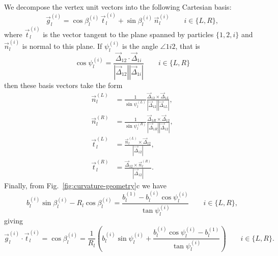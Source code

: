 We decompose the vertex unit vectors into the following Cartesian basis:
\begin{equation}\label{eq:vertex-unit-vector}
  \vec{g}_l^{(i)} =
  \cos{\beta_l^{(i)}} \, \vec{t}_l^{(i)} + \sin{\beta_l^{(i)}} \, \vec{n}_l^{(i)}
  \qquad i \in \{L,R\},
\end{equation}
where $\vec{t}_l^{(i)}$ is the vector tangent to the plane spanned by particles $\{1,2,i\}$ and $\vec{n}_l^{(i)}$ is normal to this plane.
If $\psi_l^{(i)}$ is the angle $\angle 1i2$, that is
\begin{equation}\label{eq:cos-psi}
  \cos{\psi_l^{(i)}} =
  \frac{\vec{\Delta}_{12} \cdot \vec{\Delta}_{1i}}
  {|\vec{\Delta}_{12}||\vec{\Delta}_{1i}|}
  \qquad i \in \{L,R\}
\end{equation}
then these basis vectors take the form
\begin{subequations}\label{eq:vertex-unit-vector-basis}
\begin{align}
  \vec{n}_l^{(L)} &=
  \frac{1}{\sin{\psi_l^{(L)}}}
  \frac{\vec{\Delta}_{12} \times \vec{\Delta}_{1L}}
  {|\vec{\Delta}_{12}||\vec{\Delta}_{1L}|}, \\
  \vec{n}_l^{(R)} &=
  \frac{1}{\sin{\psi_l^{(R)}}}
  \frac{\vec{\Delta}_{1R} \times \vec{\Delta}_{12}}
  {|\vec{\Delta}_{1R}||\vec{\Delta}_{12}|}, \\
  \vec{t}_l^{(L)} &=
  \frac{\vec{n}_l^{(L)} \times \vec{\Delta}_{12}}{|\vec{\Delta}_{12}|}, \\
  \vec{t}_l^{(R)} &=
  \frac{\vec{\Delta}_{12} \times \vec{n}_l^{(R)}}{|\vec{\Delta}_{12}|}.
\end{align}
\end{subequations}
Finally, from Fig.\ \ref{fig:curvature-geometry}c we have
\begin{equation}
  b_l^{(i)} \sin{\beta_l^{(i)}} - R_l \cos{\beta_l^{(i)}}
  = \frac{b_l^{(1)} - b_l^{(i)} \cos{\psi_l^{(i)}}}{\tan{\psi_l^{(i)}}}
  \qquad i \in \{L,R\},
\end{equation}
giving
\begin{equation}\label{eq:cos-beta}
  \vec{g}_l^{(i)} \cdot \vec{t}_l^{(i)} = \cos{\beta_l^{(i)}} =
  \frac{1}{R_l} \left(
    b_l^{(i)} \sin{\psi_l^{(i)}}
    + \frac{b_l^{(i)} \cos{\psi_l^{(i)}} - b_l^{(1)}}{\tan{\psi_l^{(i)}}}
  \right)
  \qquad i \in \{L,R\}.
\end{equation}

